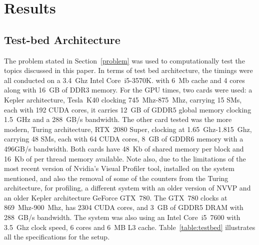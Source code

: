 \clearpage
\chapter{Results}

\section{Test-bed Architecture}

The problem stated in Section~\ref{problem} was used to computationally test the topics discussed in this paper. In terms of test bed architecture, the timings were all conducted on a 3.4~Ghz Intel Core~i5-3570K. with 6~Mb cache and 4 cores along with 16~GB of DDR3 memory. For the GPU times, two cards were used: a Kepler architecture, Tesla~K40 clocking 745~Mhz-875~Mhz, carrying 15 SMs, each with 192 CUDA cores, it carries 12~GB of GDDR5 global memory clocking 1.5~GHz and a 288~GB/s bandwidth. The other card tested was the more modern, Turing architecture, RTX~2080 Super, clocking at 1.65~Ghz-1.815~Ghz, carrying 48 SMs, each with 64 CUDA cores, 8~GB of GDDR6 memory with a 496GB/s bandwidth. Both cards have 48~Kb of shared memory per block and 16~Kb of per thread memory available. Note also, due to the limitations of the most recent version of Nvidia's Visual Profiler tool, installed on the system mentioned, and also the removal of some of the counters from the Turing architecture, for profiling, a different system with an older version of NVVP and an older Kepler architecture GeForce GTX~780. The GTX~780 clocks at 869~Mhz-900~Mhz, has 2304 CUDA cores, and 3~GB of GDDR5 DRAM with 288~GB/s bandwidth. The system was also using an Intel Core~i5~7600 with 3.5~Ghz clock speed, 6 cores and 6~MB L3 cache. Table~\ref{table:testbed} illustrates all the specifications for the setup.
\begin{table}
    \begin{center}
    \caption{Testbed architecture.}
	\label{table:testbed}
	\end{center}
\end{table}
